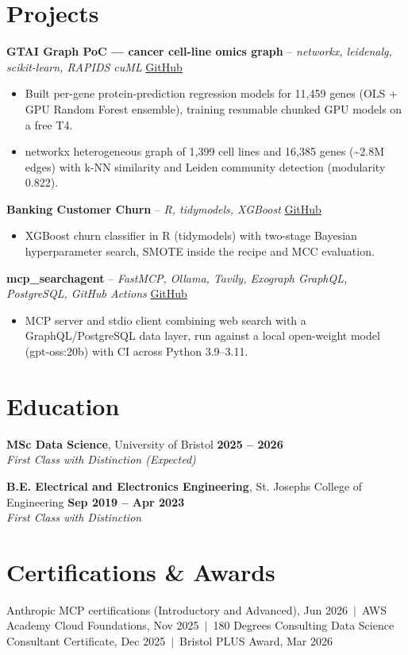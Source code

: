 \documentclass[a4paper,11pt]{article}
\begin{document}
\section{Projects}
\noindent\textbf{GTAI Graph PoC — cancer cell-line omics graph} -- \textit{networkx, leidenalg, scikit-learn, RAPIDS cuML} \hfill \href{https://github.com/Thiruvel-AP/GTAI-GraphPOC}{GitHub}
\begin{itemize}
  \item Built per-gene protein-prediction regression models for 11,459 genes (OLS + GPU Random Forest ensemble), training resumable chunked GPU models on a free T4.
  \item networkx heterogeneous graph of 1,399 cell lines and 16,385 genes (\textasciitilde{}2.8M edges) with k-NN similarity and Leiden community detection (modularity 0.822).
\end{itemize}
\vspace{3pt}
\noindent\textbf{Banking Customer Churn} -- \textit{R, tidymodels, XGBoost} \hfill \href{https://github.com/Thiruvel-AP/Banking-Customer-Churn-Prediction}{GitHub}
\begin{itemize}
  \item XGBoost churn classifier in R (tidymodels) with two-stage Bayesian hyperparameter search, SMOTE inside the recipe and MCC evaluation.
\end{itemize}
\vspace{3pt}
\noindent\textbf{mcp\_searchagent} -- \textit{FastMCP, Ollama, Tavily, Exograph GraphQL, PostgreSQL, GitHub Actions} \hfill \href{https://github.com/Thiruvel-AP/mcp_searchagent}{GitHub}
\begin{itemize}
  \item MCP server and stdio client combining web search with a GraphQL/PostgreSQL data layer, run against a local open-weight model (gpt-oss:20b) with CI across Python 3.9–3.11.
\end{itemize}

\section{Education}
\textbf{MSc Data Science}, University of Bristol \hfill \textbf{2025 – 2026}\\ \textit{First Class with Distinction (Expected)}\par
\vspace{3pt}
\textbf{B.E. Electrical and Electronics Engineering}, St. Joseph\textquotesingle{}s College of Engineering \hfill \textbf{Sep 2019 – Apr 2023}\\ \textit{First Class with Distinction}\par

\section{Certifications \& Awards}
Anthropic MCP certifications (Introductory and Advanced), Jun 2026 \,$|$\, AWS Academy Cloud Foundations, Nov 2025 \,$|$\, 180 Degrees Consulting Data Science Consultant Certificate, Dec 2025 \,$|$\, Bristol PLUS Award, Mar 2026
\end{document}
